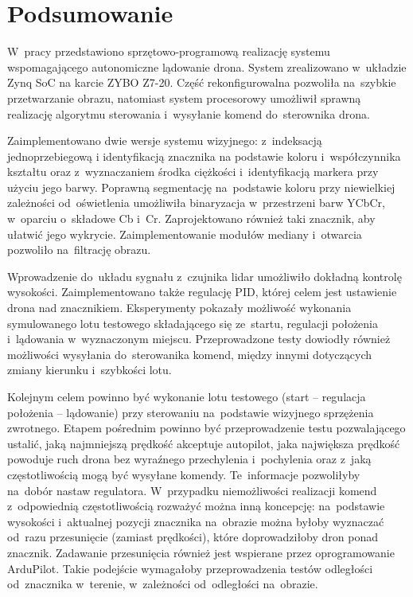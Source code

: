 \chapter{Podsumowanie}
\label{cha:Podsumowanie i kierunki dalszych prac}

W~pracy przedstawiono sprzętowo-programową realizację systemu wspomagającego autonomiczne lądowanie drona.
System zrealizowano w~układzie Zynq SoC na karcie ZYBO Z7-20. 
Część rekonfigurowalna pozwoliła na~szybkie przetwarzanie obrazu, natomiast system procesorowy umożliwił sprawną realizację algorytmu sterowania i~wysyłanie komend do~sterownika drona. 

Zaimplementowano dwie wersje systemu wizyjnego: z~indeksacją jednoprzebiegową i identyfikacją znacznika na podstawie koloru i~współczynnika kształtu oraz z~wyznaczaniem środka ciężkości i~identyfikacją markera przy użyciu jego barwy. 
Poprawną segmentację na~podstawie koloru przy niewielkiej zależności od~oświetlenia umożliwiła binaryzacja w~przestrzeni barw YCbCr, w~oparciu o~składowe Cb i~Cr. 
Zaprojektowano również taki znacznik, aby ułatwić jego wykrycie. 
Zaimplementowanie modułów mediany i~otwarcia pozwoliło na~filtrację obrazu.

Wprowadzenie do~układu sygnału z~czujnika lidar umożliwiło dokładną kontrolę wysokości.
Zaimplementowano także regulację PID, której celem jest ustawienie drona nad znacznikiem. 
Eksperymenty pokazały możliwość wykonania symulowanego lotu testowego składającego się ze~startu, regulacji położenia i~lądowania w~wyznaczonym miejscu.
Przeprowadzone testy dowiodły również możliwości wysyłania do~sterowanika komend, między innymi dotyczących zmiany kierunku i~szybkości lotu. 

Kolejnym celem powinno być wykonanie lotu testowego (start -- regulacja położenia -- lądowanie) przy sterowaniu na~podstawie wizyjnego sprzężenia zwrotnego. 
Etapem pośrednim powinno być przeprowadzenie testu pozwalającego ustalić, jaką najmniejszą prędkość akceptuje autopilot, jaka największa prędkość powoduje ruch drona bez wyraźnego przechylenia i~pochylenia oraz z~jaką częstotliwością mogą być wysyłane komendy. 
Te~informacje pozwoliłyby na~dobór nastaw regulatora. 
W~przypadku niemożliwości realizacji komend z~odpowiednią częstotliwością rozważyć można inną koncepcję: na~podstawie wysokości i~aktualnej pozycji znacznika na~obrazie można byłoby wyznaczać od~razu przesunięcie (zamiast prędkości), które doprowadziłoby dron ponad znacznik. Zadawanie przesunięcia również jest wspierane przez oprogramowanie ArduPilot. Takie podejście wymagałoby przeprowadzenia testów odległości od~znacznika w~terenie, w~zależności od~odległości na~obrazie. %

